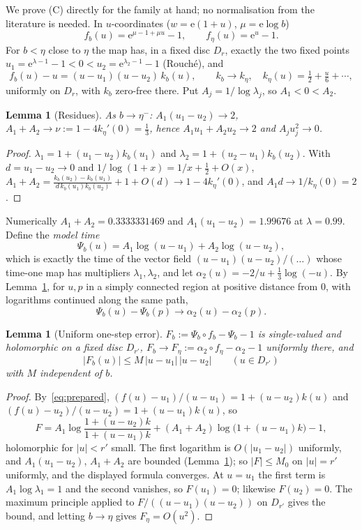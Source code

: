 \documentclass[11pt]{amsart}
\newtheorem{lemma}[theorem]{Lemma}
\theoremstyle{definition}
\newcommand{\eee}{\mathrm{e}}
\begin{document}
We prove (C) directly for the family at hand; no normalisation from the
literature is needed.  In $u$-coordinates ($w=\eee(1+u)$, $\mu=\eee\log b$)
\[
 f_b(u)=\eee^{\mu-1+\mu u}-1,\qquad f_\eta(u)=\eee^u-1 .
\]
For $b<\eta$ close to $\eta$ the map has, in a fixed disc $D_r$, exactly the two
fixed points $u_1=\eee^{\lambda-1}-1<0<u_2=\eee^{\lambda_2-1}-1$ (Rouch\'e), and
\begin{equation}\label{eq:prepared}
 f_b(u)-u=(u-u_1)(u-u_2)\,k_b(u),\qquad k_b\to k_\eta,\quad
 k_\eta(u)=\tfrac12+\tfrac u6+\cdots,
\end{equation}
uniformly on $D_r$, with $k_b$ zero-free there.  Put $A_j=1/\log\lambda_j$,
so $A_1<0<A_2$.

\begin{lemma}[Residues]\label{lem:res}
As $b\to\eta^-$: $A_1(u_1-u_2)\to2$, $A_1+A_2\to\nu:=1-4k_\eta'(0)=\tfrac13$, hence
$A_1u_1+A_2u_2\to2$ and $A_ju_j^2\to0$.
\end{lemma}

\begin{proof}
$\lambda_1=1+(u_1-u_2)k_b(u_1)$ and $\lambda_2=1+(u_2-u_1)k_b(u_2)$.  With
$d=u_1-u_2\to0$ and $1/\log(1+x)=1/x+\tfrac12+O(x)$,
$A_1+A_2=\frac{k_b(u_2)-k_b(u_1)}{d\,k_b(u_1)k_b(u_2)}+1+O(d)\to1-4k_\eta'(0)$,
and $A_1d\to1/k_\eta(0)=2$.
\end{proof}

\noindent
Numerically $A_1+A_2=0.3333331469$ and $A_1(u_1-u_2)=1.99676$ at $\lambda=0.99$.
Define the \emph{model time}
\[
 \Psi_b(u)=A_1\log(u-u_1)+A_2\log(u-u_2),
\]
which is exactly the time of the vector field $(u-u_1)(u-u_2)/(\ldots)$ whose
time-one map has multipliers $\lambda_1,\lambda_2$, and let
$\alpha_2(u)=-2/u+\tfrac13\log(-u)$.  By Lemma~\ref{lem:res}, for $u,p$ in a
simply connected region at positive distance from $0$, with logarithms
continued along the same path,
\begin{equation}\label{eq:psilimit}
 \Psi_b(u)-\Psi_b(p)\longrightarrow\alpha_2(u)-\alpha_2(p).
\end{equation}

\begin{lemma}[Uniform one-step error]\label{lem:F}
$F_b:=\Psi_b\circ f_b-\Psi_b-1$ is single-valued and holomorphic on a fixed disc
$D_{r'}$, $F_b\to F_\eta:=\alpha_2\circ f_\eta-\alpha_2-1$ uniformly there, and
\[
 |F_b(u)|\le M\,|u-u_1|\,|u-u_2|\qquad(u\in D_{r'})
\]
with $M$ independent of $b$.
\end{lemma}

\begin{proof}
By~\eqref{eq:prepared}, $(f(u)-u_1)/(u-u_1)=1+(u-u_2)k(u)$ and
$(f(u)-u_2)/(u-u_2)=1+(u-u_1)k(u)$, so
\[
 F=A_1\log\frac{1+(u-u_2)k}{1+(u-u_1)k}+(A_1+A_2)\log\bigl(1+(u-u_1)k\bigr)-1,
\]
holomorphic for $|u|<r'$ small.  The first logarithm is $O(|u_1-u_2|)$
uniformly, and $A_1(u_1-u_2)$, $A_1+A_2$ are bounded (Lemma~\ref{lem:res}); so
$|F|\le M_0$ on $|u|=r'$ uniformly, and the displayed formula converges.  At
$u=u_1$ the first term is $A_1\log\lambda_1=1$ and the second vanishes, so
$F(u_1)=0$; likewise $F(u_2)=0$.  The maximum principle applied to
$F/((u-u_1)(u-u_2))$ on $D_{r'}$ gives the bound, and letting $b\to\eta$ gives
$F_\eta=O(u^2)$.
\end{proof}
\end{document}
